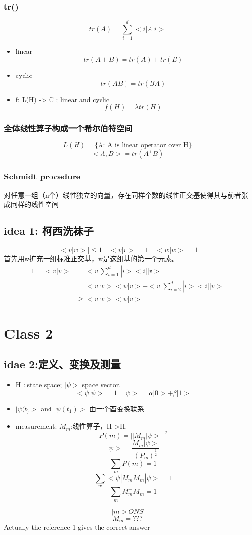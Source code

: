 \documentclass[a4paper, 11pt]{article} %
\begin{document}
\subsubsection{tr()}
$$
tr(A) = \sum_{i = 1}^d <i|A|i>
$$
\begin{itemize}
	\item
	linear 
	$$
	tr(A+B) = tr(A)+tr(B)
	$$
	\item
	cyclic
	$$
	tr(AB) = tr(BA)
	$$
	\item f: L(H) -> C ; linear and cyclic
	$$
	f(H) = \lambda tr(H)
	$$
\end{itemize}

\subsubsection{全体线性算子构成一个希尔伯特空间}
$$
L(H) = \lbrace \mbox{A: A is linear operator over H} \rbrace
$$
$$
<A,B> = tr(A^+B)
$$

\subsubsection{Schmidt procedure}
对任意一组（n个）线性独立的向量，存在同样个数的线性正交基使得其与前者张成同样的线性空间


\subsection{idea 1: 柯西洗袜子}
$$
|<v|w>| \leq 1 \quad <v|v> = 1 \quad <w|w> = 1
$$
首先用w扩充一组标准正交基，w是这组基的第一个元素。
\begin{align*}
1 = <v|v> & = <v| \sum_{i = 1}^d |i><i| |v>\\
& = <v|w><w|v> + <v| \sum_{i = 2}^d |i><i| |v>\\
& \geq <v|w><w|v>
\end{align*}

\section{Class 2}

\subsection{idae 2:定义、变换及测量}
\begin{itemize}
\item	
H : state space; $|\psi>$ space vector.
$$
<\psi|\psi> =1 \quad |\psi> = \alpha |0> + \beta |1> 
$$
\item
$|\psi(t_)>$ and $|\psi(t_1)>$ 由一个酉变换联系
\item
measurement: $M_m$:线性算子，H->H. 
$$
P(m) = ||M_m|\psi>||^2
$$
$$
|\psi> = \frac{M_m|\psi>}{(P_m)^{\frac{1}{2}}}
$$
$$
\sum_m P(m) = 1
$$
$$
\sum_m <\psi|M_m^+M_m|\psi> = 1
$$
$$
\sum_m M_m^+M_m = 1
$$
\end{itemize}
$$
{|m>} ONS
$$
$$
M_m = ???
$$
Actually the reference 1 gives the correct answer.
\end{document}
